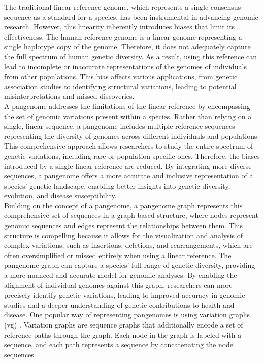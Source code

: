 \documentclass[11pt]{ucthesis}
\begin{document}
The traditional linear reference genome, which represents a single consensus sequence as a standard for a species, has been instrumental in advancing genomic research. However, this linearity inherently introduces biases that limit its effectiveness. The human reference genome is a linear genome representing a single haplotype copy of the genome. Therefore, it does not adequately capture the full spectrum of human genetic diversity. As a result, using this reference can lead to incomplete or inaccurate representations of the genomes of individuals from other populations. This bias affects various applications, from genetic association studies to identifying structural variations, leading to potential misinterpretations and missed discoveries.\\
A pangenome addresses the limitations of the linear reference by encompassing the set of genomic variations present within a species. Rather than relying on a single, linear sequence, a pangenome includes multiple reference sequences representing the diversity of genomes across different individuals and populations. This comprehensive approach allows researchers to study the entire spectrum of genetic variations, including rare or population-specific ones. Therefore, the biases introduced by a single linear reference are reduced. By integrating more diverse sequences, a pangenome offers a more accurate and inclusive representation of a species' genetic landscape, enabling better insights into genetic diversity, evolution, and disease susceptibility.\\
Building on the concept of a pangenome, a pangenome graph represents this comprehensive set of sequences in a graph-based structure, where nodes represent genomic sequences and edges represent the relationships between them. This structure is compelling because it allows for the visualization and analysis of complex variations, such as insertions, deletions, and rearrangements, which are often oversimplified or missed entirely when using a linear reference. The pangenome graph can capture a species' full range of genetic diversity, providing a more nuanced and accurate model for genomic analyses. By enabling the alignment of individual genomes against this graph, researchers can more precisely identify genetic variations, leading to improved accuracy in genomic studies and a deeper understanding of genetic contributions to health and disease. One popular way of representing pangenomes is using variation graphs (vg) \cite{garrison2018variation}. Variation graphs are sequence graphs that additionally encode a set of reference paths through the graph. Each node in the graph is labeled with a sequence, and each path represents a sequence by concatenating the node sequences.\\
\end{document}
